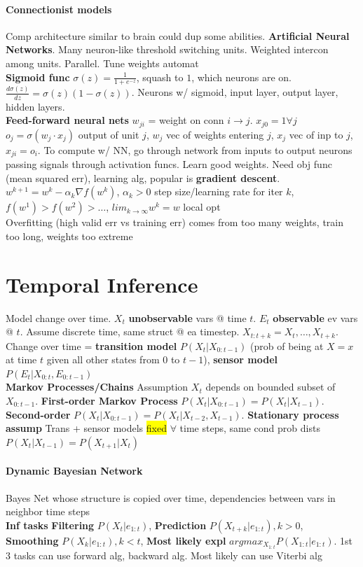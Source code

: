 \paragraph{Connectionist models} Comp architecture similar to brain
could dup some abilities. \textbf{Artificial Neural
  Networks}. Many neuron-like threshold switching units. Weighted
intercon among units. Parallel. Tune weights automat
\\ \textbf{Sigmoid func} $\sigma(z)=\frac{1}{1+e^{-z}}$,
squash to $1$, which neurons are
on. $\frac{d{\sigma(z)}}{d{z}}=\sigma(z)(1-\sigma(z))$. Neurons w/
sigmoid, input layer, output layer, hidden layers.
\\ \textbf{Feed-forward neural nets} $w_{ji}$ = weight on conn $i \to
j$. $x_{j0}=1 \forall j$ $o_j = \sigma(w_j \cdot x_j)$ output of unit
$j$, $w_j$ vec of weights entering $j$,
$x_j$ vec of inp to $j$, $x_{ji}=o_i$. To compute w/ NN, go through
network from inputs to output neurons passing signals through
activation funcs. Learn good weights. Need obj func (mean squared err),
learning alg, popular is \textbf{gradient
  descent}. $w^{k+1}=w^{k}-\alpha_k \nabla f (w^k)$, $\alpha_k>0$ step
size/learning rate for iter $k$,
$f(w^1)>f(w^2)>\ldots$, $lim_{k \to \infty}w^k = w$ local opt
\\ Overfitting (high valid err vs training err) comes from too many weights, train too long, weights
too extreme

\color[HTML]{2A2C5A}
\section{Temporal Inference}
Model change over time. $X_t$ \textbf{unobservable} vars @ time
$t$. $E_t$ \textbf{observable} ev vars @ $t$. Assume discrete time,
same struct @ ea timestep. $X_{t:t+k}=X_t ,\ldots,X_{t+k}$. Change
over time = \textbf{transition model} $P(X_t|X_{0:t-1})$ (prob of
being at $X=x$ at time $t$ given all other states from $0$ to $t-1$),
\textbf{sensor model} $P(E_t | X_{0:t}, E_{0:t-1})$
\\ \textbf{Markov Processes/Chains} Assumption $X_t$ depends on
bounded subset of $X_{0:t-1}$. \textbf{First-order Markov Process}
$P(X_t|X_{0:t-1})=P(X_t | X_{t-1})$. \textbf{Second-order}
$P(X_t|X_{0:t-1})=P(X_t|X_{t-2},X_{t-1})$. \textbf{Stationary process
  assump} Trans + sensor models \colorbox{yellow}{fixed} $\forall$ time steps, same cond
prob dists $P(X_t|X_{t-1})=P(X_{t+1}|X_t)$
\paragraph{Dynamic Bayesian Network} Bayes Net whose structure is
copied over time, dependencies between vars in neighbor time steps
\\ \textbf{Inf tasks} \textbf{Filtering} $P(X_t|e_{1:t})$,
\textbf{Prediction} $P(X_{t+k}|e_{1:t}), k>0$, \textbf{Smoothing}
$P(X_k|e_{1:t}), k<t$, \textbf{Most likely expl}
$argmax_{X_{1:t}}P(X_{1:t}|e_{1:t})$. 1st 3 tasks can use forward alg,
backward alg. Most likely can use Viterbi alg
